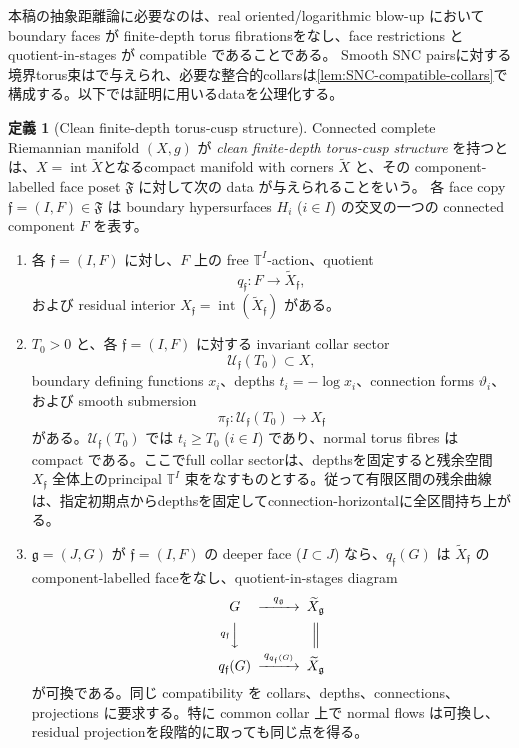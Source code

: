 \documentclass[11pt,a4paper]{ltjsarticle}
\newcommand{\wt}{\widetilde}
\theoremstyle{plain}
\theoremstyle{definition}
\newtheorem{definition}[definition]{定義}
\theoremstyle{remark}
\begin{document}
本稿の抽象距離論に必要なのは、real oriented/logarithmic blow-up において boundary faces が finite-depth torus fibrationsをなし、face restrictions と quotient-in-stages が compatible であることである。
Smooth SNC pairsに対する境界torus束は\cite[Lemma~1.1]{RochonZhang}で与えられ、必要な整合的collarsは\cref{lem:SNC-compatible-collars}で構成する。以下では証明に用いるdataを公理化する。

\begin{definition}[Clean finite-depth torus-cusp structure]
\label{def:clean}
Connected complete Riemannian manifold $(X,g)$ が \emph{clean finite-depth torus-cusp structure} を持つとは、$X=\operatorname{int}\wt X$となるcompact manifold with corners $\wt X$ と、その component-labelled face poset $\mathfrak F$ に対して次の data が与えられることをいう。
各 face copy $\mathfrak f=(I,F)\in\mathfrak F$ は boundary hypersurfaces $H_i$ ($i\in I$) の交叉の一つの connected component $F$ を表す。
\begin{enumerate}
 \item 各 $\mathfrak f=(I,F)$ に対し、$F$ 上の free $\mathbb T^I$-action、quotient
 \[
   q_{\mathfrak f}:F\longrightarrow \wt X_{\mathfrak f},
 \]
 および residual interior $X_{\mathfrak f}=\operatorname{int}(\wt X_{\mathfrak f})$ がある。
 \item $T_0>0$ と、各 $\mathfrak f=(I,F)$ に対する invariant collar sector
 \[
   \mathcal U_{\mathfrak f}(T_0)\subset X,
 \]
 boundary defining functions $x_i$、depths $t_i=-\log x_i$、connection forms $\vartheta_i$、および smooth submersion
 \[
   \pi_{\mathfrak f}:\mathcal U_{\mathfrak f}(T_0)\longrightarrow X_{\mathfrak f}
 \]
 がある。$\mathcal U_{\mathfrak f}(T_0)$ では $t_i\ge T_0$ ($i\in I$) であり、normal torus fibres は compact である。ここでfull collar sectorは、depthsを固定すると残余空間 $X_{\mathfrak f}$ 全体上のprincipal $\mathbb T^I$ 束をなすものとする。従って有限区間の残余曲線は、指定初期点からdepthsを固定してconnection-horizontalに全区間持ち上がる。
 \item $\mathfrak g=(J,G)$ が $\mathfrak f=(I,F)$ の deeper face ($I\subset J$) なら、$q_{\mathfrak f}(G)$ は $\wt X_{\mathfrak f}$ の component-labelled faceをなし、quotient-in-stages diagram
 \[
 \begin{CD}
   G @>{q_{\mathfrak g}}>> \wt X_{\mathfrak g}\\
   @V{q_{\mathfrak f}}VV @|\\
   q_{\mathfrak f}(G) @>{q_{q_{\mathfrak f}(G)}}>> \wt X_{\mathfrak g}
 \end{CD}
 \]
 が可換である。同じ compatibility を collars、depths、connections、projections に要求する。特に common collar 上で normal flows は可換し、residual projectionを段階的に取っても同じ点を得る。

\end{enumerate}
\end{definition}
\end{document}
